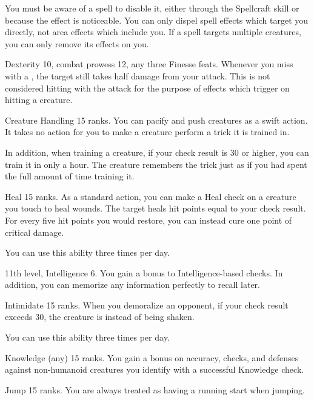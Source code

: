 You must be aware of a spell to disable it, either through the Spellcraft skill or because the effect is noticeable.
You can only dispel spell effects which target you directly, not area effects which include you.
If a spell targets multiple creatures, you can only remove its effects on you.

\featpres Dexterity 10, combat prowess 12, any three Finesse feats.
\featben Whenever you miss with a , the target still takes half damage from your attack.
This is not considered hitting with the attack for the purpose of effects which trigger on hitting a creature.

\featpre Creature Handling 15 ranks.
\featben You can pacify and push creatures as a swift action.
It takes no action for you to make a creature perform a trick it is trained in.

In addition, when training a creature, if your check result is 30 or higher, you can train it in only a hour.
The creature remembers the trick just as if you had spent the full amount of time training it.

\featpre Heal 15 ranks.
\featben As a standard action, you can make a Heal check on a creature you touch to heal wounds.
The target heals hit points equal to your check result.
For every five hit points you would restore, you can instead cure one point of critical damage.

You can use this ability three times per day.

\featpres 11th level, Intelligence 6.
\featben You gain a  bonus to Intelligence-based checks.
In addition, you can memorize any information perfectly to recall later.

\featpre Intimidate 15 ranks.
\featben When you demoralize an opponent, if your check result exceeds 30, the creature is \panicked instead of being shaken.

You can use this ability three times per day.

\featpre Knowledge (any) 15 ranks.
\featben You gain a  bonus on accuracy, checks, and defenses against non-humanoid creatures you identify with a successful Knowledge check.

\featpre Jump 15 ranks.
\featben You are always treated as having a running start when jumping.


